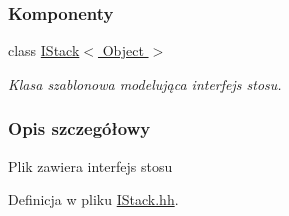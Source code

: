 \subsubsection*{Komponenty}
\begin{DoxyCompactItemize}
\item 
class \hyperlink{class_i_stack}{I\-Stack$<$ Object $>$}
\begin{DoxyCompactList}\small\item\em Klasa szablonowa modelująca interfejs stosu. \end{DoxyCompactList}\end{DoxyCompactItemize}


\subsubsection{Opis szczegółowy}
Plik zawiera interfejs stosu 

Definicja w pliku \hyperlink{_i_stack_8hh_source}{I\-Stack.\-hh}.

